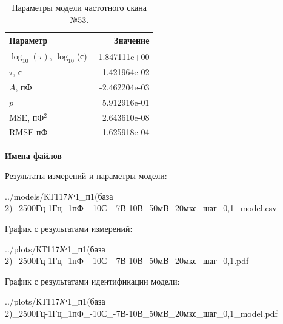 \begin{table}[!ht]
    \centering
    \caption{Параметры модели частотного скана №53.}
    \begin{tabular}{|l|r|}
        \hline
        Параметр                                       & Значение                  \\ \hline
        $\log_{10}(\tau)$, $\log_{10}$(с)              & -1.847111e+00             \\ \hline
        $\tau$, с                                      & 1.421964e-02              \\ \hline
        $A$, пФ                                        & -2.462204e-03             \\ \hline
        $p$                                            & 5.912916e-01              \\ \hline
        MSE, пФ$^2$                                    & 2.643610e-08              \\ \hline
        RMSE пФ                                        & 1.625918e-04              \\ \hline
    \end{tabular}
    \label{table:frequency_scan_model_53}
\end{table}

\textbf{Имена файлов}

Результаты измерений и параметры модели:

\scriptsize../models/КТ117№1\_п1(база 2)\_2500Гц-1Гц\_1пФ\_-10С\_-7В-10В\_50мВ\_20мкс\_шаг\_0,1\_model.csv
\normalsize

График с результатами измерений:

\scriptsize../plots/КТ117№1\_п1(база 2)\_2500Гц-1Гц\_1пФ\_-10С\_-7В-10В\_50мВ\_20мкс\_шаг\_0,1.pdf
\normalsize

График с результатами идентификации модели:

\scriptsize../plots/КТ117№1\_п1(база 2)\_2500Гц-1Гц\_1пФ\_-10С\_-7В-10В\_50мВ\_20мкс\_шаг\_0,1\_model.pdf
\normalsize

